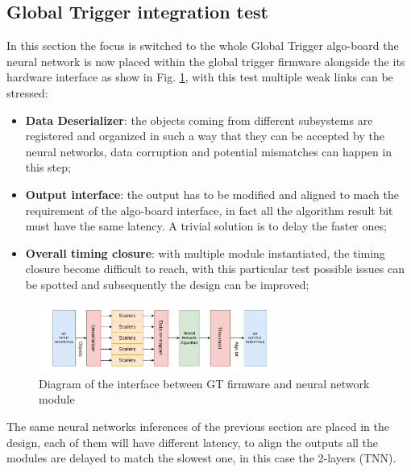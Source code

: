 \documentclass[../../main.tex]{subfiles}
\begin{document}
        
\subsection{Global Trigger integration test}
\label{sec:P2GT_test_gt}
In this section the focus is switched to the whole Global Trigger algo-board the neural network is now placed within the global trigger firmware alongside the its hardware interface as show in Fig. \ref{fig:GT-interface-diag}, with this test multiple weak links can be stressed:
\begin{itemize}
    \item \textbf{Data Deserializer}: the objects coming from different subsystems are registered and organized in such a way that they can be accepted by the neural networks, data corruption and potential mismatches can happen in this step;
    \item \textbf{Output interface}: the output has to be modified and aligned to mach the requirement of the algo-board interface, in fact all the algorithm result bit must have the same latency. A trivial solution is to delay the faster ones; 
    \item \textbf{Overall timing closure}: with multiple module instantiated, the timing closure become difficult to reach, with this particular test possible issues can be spotted and subsequently the design can be improved;
\end{itemize}
        
\begin{figure}[h]
    \centering
    \includegraphics[width=0.7\textwidth]{sections/05/Images/NN_GT-interface.pdf}
    \caption{Diagram of the interface between GT firmware and neural network module}
    \label{fig:GT-interface-diag}
\end{figure}

The same neural networks inferences of the previous section are placed in the design, each of them will have different latency, to align the outputs all the modules are delayed to match the slowest one, in this case the 2-layers (TNN).  
\end{document}
